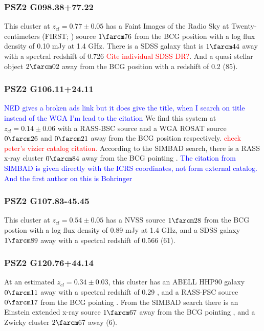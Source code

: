 \documentclass[apj, revtex4-1]{emulateapj}
\newcommand{\editorial}[1]{\textcolor{red}{#1}}
\newcommand{\peditorial}[1]{\textcolor{blue}{#1}}
\begin{document}
\subsubsection{PSZ2 G098.38+77.22}
This cluster at $z_{cl} = 0.77 \pm 0.05$ has a Faint Images of the Radio Sky at Twenty-centimeters (FIRST; \citealt{Becker1995}) source $1\farcm76$ from the BCG position with a log flux density of 0.10 mJy at 1.4 GHz. There is a SDSS galaxy that is $1\farcm44$ away with a spectral redshift of 0.726 \editorial{Cite individual SDSS DR?}. And a quasi stellar object $2\farcm02$ away from the BCG position with a redshift of 0.2 (85).

\subsubsection{PSZ2 G106.11+24.11}
\peditorial{NED gives a broken ads link but it does give the title, when I search on title instead of the WGA I'm lead to the citation} %
We find this system at $z_{cl} = 0.14 \pm 0.06$ with a RASS-BSC source and a WGA ROSAT
source $0\farcm26$ and $0\farcm21$ away from the BCG position respectively. \editorial{check peter's vizier catalog citation.} According to the SIMBAD search, there is a RASS x-ray cluster $0\farcm84$ away from the BCG pointing \citep{Bohringer2000}. \peditorial{The citation from SIMBAD is given directly with the ICRS coordinates, not form external catalog. And the first author on this is Bohringer}

\subsubsection{PSZ2 G107.83-45.45}
This cluster at $z_{cl} = 0.54 \pm 0.05$ has a NVSS source $1\farcm28$ from the BCG postion with a log flux density of 0.89 mJy at 1.4 GHz, and a SDSS galaxy $1\farcm89$ away with a spectral redshift of 0.566 (61).

\subsubsection{PSZ2 G120.76+44.14}
At an estimated $z_{cl} = 0.34 \pm 0.03$, this cluster has an ABELL HHP90 galaxy $0\farcm11$ away with a spectral redshift of 0.29 \citep{Huchra1990}, and a RASS-FSC source $0\farcm17$ from the BCG pointing \citep{Voges2000}. From the SIMBAD search there is an Einstein extended x-ray source $1\farcm67$ away from the BCG pointing \citep{Oppenheimer1997}, and a Zwicky cluster $2\farcm67$ away (6).
\end{document}
